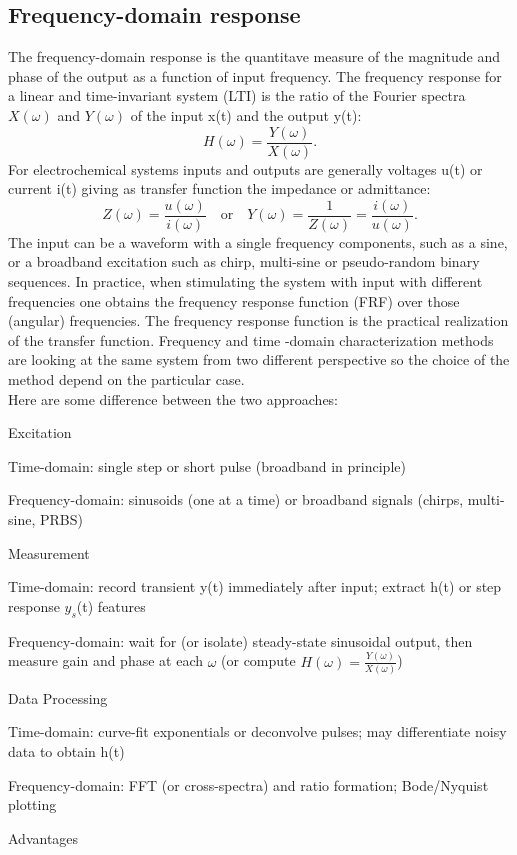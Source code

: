 \subsection{Frequency-domain response}
The frequency-domain response is the quantitave measure of the magnitude and phase of the output as a function of input frequency. The frequency response for a linear and time-invariant system (LTI) is the ratio of the Fourier spectra $X(\omega)$ and $Y(\omega)$ of the input x(t) and the output y(t):
$$
H(\omega) = \frac{Y(\omega)}{X(\omega)}.
$$
For electrochemical systems inputs and outputs are generally voltages u(t) or current i(t) giving as transfer function the impedance or admittance:
$$
Z(\omega) = \frac{u(\omega)}{i(\omega)} \quad \text{or} \quad Y(\omega) = \frac{1}{Z(\omega)}= \frac{i(\omega)}{u(\omega)}.
$$
The input can be a waveform with a single frequency components, such as a sine, or a broadband excitation such as chirp, multi-sine or pseudo-random binary sequences. In practice, when stimulating the system with input with different frequencies one obtains the frequency response function (FRF) over those (angular) frequencies. The frequency response function is the practical realization of the transfer function. 
Frequency and time -domain characterization methods are looking at the same system from two different perspective so the choice of the method depend on the particular case.\\
Here are some difference between the two approaches:\

Excitation\

Time-domain: single step or short pulse (broadband in principle)\

Frequency-domain: sinusoids (one at a time) or broadband signals (chirps, multi-sine, PRBS)\

Measurement\

Time-domain: record transient y(t) immediately after input; extract h(t) or step response $y_s$(t) features\

Frequency-domain: wait for (or isolate) steady-state sinusoidal output, then measure gain and phase at each $\omega$ (or compute $H(\omega)=\frac{Y(\omega)}{X(\omega)}$)\

Data Processing\

Time-domain: curve-fit exponentials or deconvolve pulses; may differentiate noisy data to obtain h(t)\

Frequency-domain: FFT (or cross-spectra) and ratio formation; Bode/Nyquist plotting\

Advantages\

